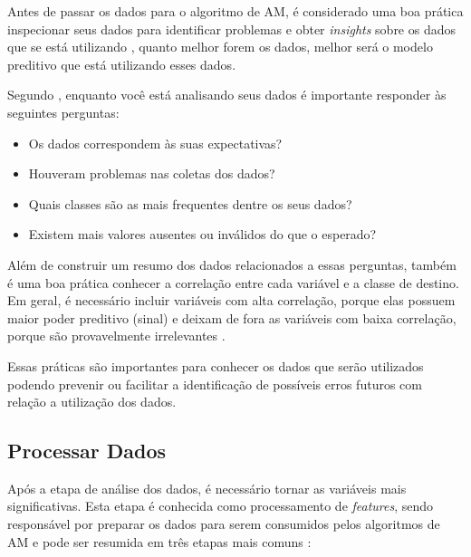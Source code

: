 Antes de passar os dados para o algoritmo de AM, é considerado uma boa prática inspecionar seus dados para identificar problemas e obter \textit{insights} sobre os dados que se está utilizando \cite{Amazon}, quanto melhor forem os dados, melhor será o modelo preditivo que está utilizando esses dados.

Segundo , enquanto você está analisando seus dados é importante responder às seguintes perguntas:
\begin{itemize}
	\item Os dados correspondem às suas expectativas?
	\item Houveram problemas nas coletas dos dados?
	\item Quais classes são as mais frequentes dentre os seus dados?
	\item Existem mais valores ausentes ou inválidos do que o esperado?
\end{itemize}

Além de construir um resumo dos dados relacionados a essas perguntas, também é uma boa prática conhecer a correlação entre cada variável e a classe de destino. Em geral, é necessário incluir variáveis com alta correlação, porque elas possuem maior poder preditivo (sinal) e deixam de fora as variáveis com baixa correlação, porque são provavelmente irrelevantes \cite{Amazon}.

Essas práticas são importantes para conhecer os dados que serão utilizados podendo prevenir ou facilitar a identificação de possíveis erros futuros com relação a utilização dos dados.

\subsection{Processar Dados}

Após a etapa de análise dos dados, é necessário tornar as variáveis mais significativas. Esta etapa é conhecida como processamento de \textit{features}, sendo responsável por preparar os dados para serem consumidos pelos algoritmos de AM e pode ser resumida em três etapas mais comuns \cite{blum1997selection}:

